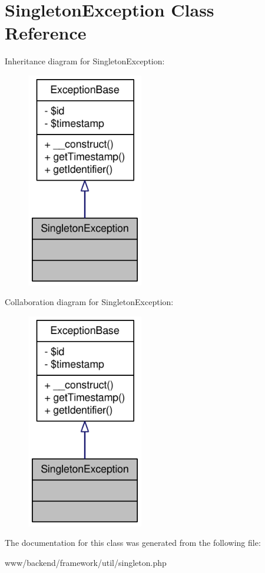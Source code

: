 \hypertarget{classSingletonException}{
\section{SingletonException Class Reference}
\label{classSingletonException}
}


Inheritance diagram for SingletonException:\nopagebreak
\begin{figure}[H]
\begin{center}
\leavevmode
\includegraphics[width=144pt]{classSingletonException__inherit__graph}
\end{center}
\end{figure}


Collaboration diagram for SingletonException:\nopagebreak
\begin{figure}[H]
\begin{center}
\leavevmode
\includegraphics[width=144pt]{classSingletonException__coll__graph}
\end{center}
\end{figure}


The documentation for this class was generated from the following file:\begin{DoxyCompactItemize}
\item 
www/backend/framework/util/singleton.php\end{DoxyCompactItemize}
